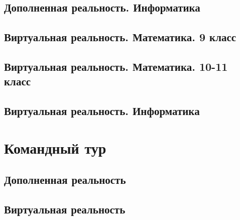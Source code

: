 \documentclass[a4paper,12pt,oneside]{book}
\begin{document}
\section{Дополненная реальность. Информатика}


\section{Виртуальная реальность. Математика. 9 класс}


\section{Виртуальная реальность. Математика. 10-11 класс}


\section{Виртуальная реальность. Информатика}



\chapter{Командный тур}

\section{Дополненная реальность} 


\section{Виртуальная реальность}



\end{document}
